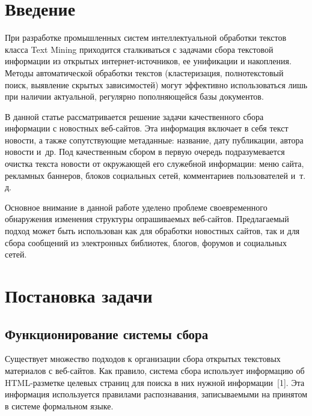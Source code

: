       \begin{multicols}{2}

            \label{st\stat}
  

\section{Введение}
  
    При разработке промышленных систем интеллектуальной обработки текстов 
класса Text Mining приходится сталкиваться с задачами сбора текстовой 
информации из открытых ин\-тер\-нет-ис\-точ\-ни\-ков, ее унификации и 
накопления. Методы автоматической обработки текстов (кластеризация, 
полнотекстовый поиск, выявление скрытых зависимостей) могут эффективно 
использоваться лишь при наличии актуальной, регулярно пополняющейся базы 
документов.


  
    В данной статье рассматривается решение задачи качественного сбора 
информации с новостных веб-сай\-тов. Эта информация включает в себя текст 
новости, а также сопутствующие метаданные: название, дату публикации, 
автора новости и~др. Под качественным сбором в первую очередь 
подразумевается очистка текста новости от окружающей его служебной 
информации: меню сайта, рекламных баннеров, блоков социальных сетей, 
комментариев пользователей и~т.\,д. 
  
    Основное внимание в данной работе уделено проблеме своевременного 
обнаружения изменения структуры опрашиваемых веб-сай\-тов. Пред\-ла\-га\-емый 
подход может быть использован как для обработки новостных сайтов, так и для 
сбора сообщений из электронных библиотек, блогов, форумов и социальных сетей.

\section{Постановка задачи}

\vspace*{-3pt}
  
\subsection{Функционирование системы сбора}

\vspace*{-3pt}
  
    Существует множество подходов к организации сбора открытых текстовых 
материалов с веб-сай\-тов. Как правило, система сбора использует информацию 
об HTML-раз\-мет\-ке целевых страниц для поиска в них нужной 
информации~[1]. Эта информация используется правилами распознавания, 
записываемыми на принятом в системе формальном языке. 


\end{multicols}
